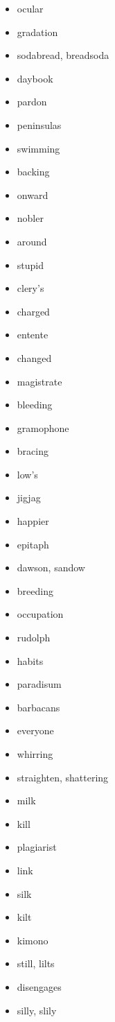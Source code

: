 \documentclass{article}
\begin{document}
\begin{itemize}
    \item ocular
    \item gradation
    \item sodabread, breadsoda
    \item daybook
    \item pardon
    \item peninsulas
    \item swimming
    \item backing
    \item onward
    \item nobler
    \item around
    \item stupid
    \item clery's
    \item charged
    \item entente
    \item changed
    \item magistrate
    \item bleeding
    \item gramophone
    \item bracing
    \item low's
    \item jigjag
    \item happier
    \item epitaph
    \item dawson, sandow
    \item breeding
    \item occupation
    \item rudolph
    \item habits
    \item paradisum
    \item barbacans
    \item everyone
    \item whirring
    \item straighten, shattering
    \item milk
    \item kill
    \item plagiarist
    \item link
    \item silk
    \item kilt
    \item kimono
    \item still, lilts
    \item disengages
    \item silly, slily

\end{itemize}
\end{document}
